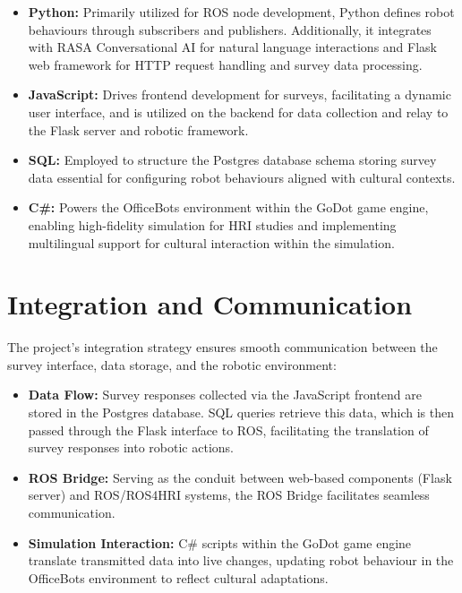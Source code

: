 \begin{itemize}
    \item \textbf{Python:} Primarily utilized for ROS node development, Python defines robot behaviours through subscribers and publishers. Additionally, it integrates with RASA Conversational AI for natural language interactions and Flask web framework for HTTP request handling and survey data processing.
    \item \textbf{JavaScript:} Drives frontend development for surveys, facilitating a dynamic user interface, and is utilized on the backend for data collection and relay to the Flask server and robotic framework.
    \item \textbf{SQL:} Employed to structure the Postgres database schema storing survey data essential for configuring robot behaviours aligned with cultural contexts.
    \item \textbf{C\#:} Powers the OfficeBots environment within the GoDot game engine, enabling high-fidelity simulation for HRI studies and implementing multilingual support for cultural interaction within the simulation.
\end{itemize}

\section{Integration and Communication}

The project's integration strategy ensures smooth communication between the survey interface, data storage, and the robotic environment:

\begin{itemize}
    \item \textbf{Data Flow:} Survey responses collected via the JavaScript frontend are stored in the Postgres database. SQL queries retrieve this data, which is then passed through the Flask interface to ROS, facilitating the translation of survey responses into robotic actions.
    \item \textbf{ROS Bridge:} Serving as the conduit between web-based components (Flask server) and ROS/ROS4HRI systems, the ROS Bridge facilitates seamless communication.
    \item \textbf{Simulation Interaction:} C\# scripts within the GoDot game engine translate transmitted data into live changes, updating robot behaviour in the OfficeBots environment to reflect cultural adaptations.
\end{itemize}

